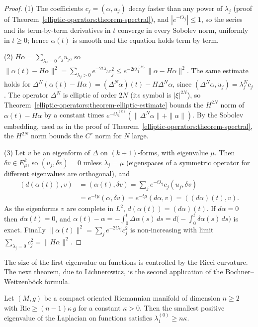 \begin{proof}
(1) The coefficients $c_j = (\alpha, u_j)$ decay faster than any power of $\lambda_j$ (proof of Theorem~\ref{elliptic-operators:theorem-spectral}), and $|e^{-t\lambda_j}| \leq 1$, so the series and its term-by-term
derivatives in $t$ converge in every Sobolev norm, uniformly in $t \geq 0$; hence $\alpha(t)$ is smooth and the equation holds term by term.

(2) $H\alpha = \sum_{\lambda_j = 0}c_ju_j$, so $\|\alpha(t) - H\alpha\|^2 = \sum_{\lambda_j > 0}e^{-2t\lambda_j}c_j^2 \leq e^{-2t\lambda_1^{(k)}}\|\alpha - H\alpha\|^2$. The same estimate holds for
$\Delta^N(\alpha(t) - H\alpha) = (\Delta^N\alpha)(t) - H\Delta^N\alpha$, since $(\Delta^N\alpha, u_j) = \lambda_j^Nc_j$. The operator $\Delta^N$ is elliptic of order $2N$ (its symbol is $|\xi|^{2N}$), so
Theorem~\ref{elliptic-operators:theorem-elliptic-estimate} bounds the $H^{2N}$ norm of $\alpha(t) - H\alpha$ by a constant times $e^{-t\lambda_1^{(k)}}(\|\Delta^N\alpha\| + \|\alpha\|)$. By the Sobolev embedding, used as in the proof of Theorem~\ref{elliptic-operators:theorem-spectral}, the $H^{2N}$ norm bounds the $C^r$ norm for
$N$ large.

(3) Let $v$ be an eigenform of $\Delta$ on $(k+1)$-forms, with eigenvalue $\mu$. Then $\delta v \in E^k_\mu$, so $(u_j, \delta v) = 0$ unless $\lambda_j = \mu$ (eigenspaces of a symmetric operator for different
eigenvalues are orthogonal), and
\[\begin{aligned}
(d(\alpha(t)), v) &= (\alpha(t), \delta v) = \sum_je^{-t\lambda_j}c_j(u_j, \delta v)\\
&= e^{-t\mu}(\alpha, \delta v) = e^{-t\mu}(d\alpha, v) = ((d\alpha)(t), v).
\end{aligned}\]
As the eigenforms $v$ are complete in $L^2$, $d(\alpha(t)) = (d\alpha)(t)$. If $d\alpha = 0$ then $d\alpha(t) = 0$, and
$\alpha(t) - \alpha = -\int_0^t\Delta\alpha(s)\,ds = d\bigl(-\int_0^t\delta\alpha(s)\,ds\bigr)$ is exact. Finally $\|\alpha(t)\|^2 = \sum_je^{-2t\lambda_j}c_j^2$ is non-increasing with limit $\sum_{\lambda_j = 0}c_j^2 = \|H\alpha\|^2$.
\end{proof}

The size of the first eigenvalue on functions is controlled by the Ricci curvature. The next theorem, due to Lichnerowicz, is the second application of the Bochner--Weitzenb\"ock formula.

\begin{theorem}[Lichnerowicz]\label{hodge-theorem:theorem-lichnerowicz}
Let $(M, g)$ be a compact oriented Riemannian manifold of dimension $n \geq 2$ with $\mathrm{Ric} \geq (n - 1)\kappa\,g$ for a constant $\kappa > 0$. Then the smallest positive eigenvalue of the Laplacian on functions
satisfies $\lambda_1^{(0)} \geq n\kappa$.
\end{theorem}

